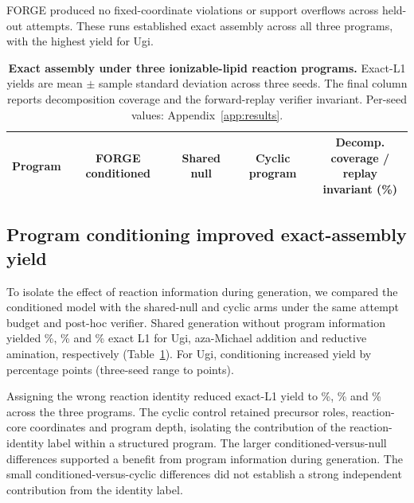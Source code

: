 FORGE produced no fixed-coordinate violations or support overflows across
\ForgeProseConditionedTotalAttempts{} held-out attempts. These runs established exact assembly across
all three programs, with the highest yield for Ugi.

\begin{table}[H]
\caption{\textbf{Exact assembly under three ionizable-lipid reaction programs.}
Exact-L1 yields are mean $\pm$ sample standard deviation across three seeds. The final column reports
decomposition coverage and the forward-replay verifier invariant. Per-seed values:
Appendix~\ref{app:results}.}
\label{tab:iclr-shared-programs}
\centering
\small
\setlength{\tabcolsep}{4.6pt}
\begin{tabular}{@{}lcccc@{}}
\toprule
Program & FORGE conditioned & Shared null & Cyclic program &
\shortstack{Decomp. coverage /\\ replay invariant (\%)} \\
\midrule
%
\end{tabular}
\end{table}

\subsection{Program conditioning improved exact-assembly yield}
To isolate the effect of reaction information during generation, we compared the conditioned
model with the shared-null and cyclic arms under the same attempt budget and post-hoc verifier.
Shared generation without program information yielded \ForgeTableOneNullUgiYield\%,
\ForgeTableOneNullBLYield\% and \ForgeTableOneNullLXYield\% exact L1 for Ugi, aza-Michael addition
and reductive amination, respectively (Table~\ref{tab:iclr-shared-programs}). For Ugi, conditioning
increased yield by \ForgeTableOneNullUgiDifferencePP{} percentage points (three-seed range
\ForgeTableOneNullUgiRangeLowPP{} to \ForgeTableOneNullUgiRangeHighPP{} points).

Assigning the wrong reaction identity reduced exact-L1 yield to
\ForgeTableOneCyclicUgiYield\%, \ForgeTableOneCyclicBLYield\% and
\ForgeTableOneCyclicLXYield\% across the three programs. The cyclic control retained precursor roles, reaction-core
coordinates and program depth, isolating the contribution of the reaction-identity label within a
structured program. The larger conditioned-versus-null differences supported a benefit from program
information during generation. The small conditioned-versus-cyclic differences did not establish
a strong independent contribution from the identity label.


